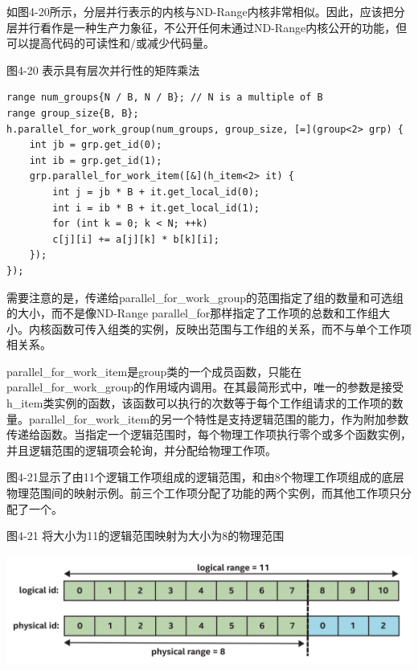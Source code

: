 如图4-20所示，分层并行表示的内核与ND-Range内核非常相似。因此，应该把分层并行看作是一种生产力象征，不公开任何未通过ND-Range内核公开的功能，但可以提高代码的可读性和/或减少代码量。\par

\hspace*{\fill} \par %
图4-20 表示具有层次并行性的矩阵乘法
\begin{lstlisting}[caption={}]
range num_groups{N / B, N / B}; // N is a multiple of B
range group_size{B, B};
h.parallel_for_work_group(num_groups, group_size, [=](group<2> grp) {
	int jb = grp.get_id(0);
	int ib = grp.get_id(1);
	grp.parallel_for_work_item([&](h_item<2> it) {
		int j = jb * B + it.get_local_id(0);
		int i = ib * B + it.get_local_id(1);
		for (int k = 0; k < N; ++k)
		c[j][i] += a[j][k] * b[k][i];
	});
});
\end{lstlisting}

需要注意的是，传递给parallel\_for\_work\_group的范围指定了组的数量和可选组的大小，而不是像ND-Range parallel\_for那样指定了工作项的总数和工作组大小。内核函数可传入组类的实例，反映出范围与工作组的关系，而不与单个工作项相关系。\par

parallel\_for\_work\_item是group类的一个成员函数，只能在parallel\_for\_work\_group的作用域内调用。在其最简形式中，唯一的参数是接受h\_item类实例的函数，该函数可以执行的次数等于每个工作组请求的工作项的数量。parallel\_for\_work\_item的另一个特性是支持逻辑范围的能力，作为附加参数传递给函数。当指定一个逻辑范围时，每个物理工作项执行零个或多个函数实例，并且逻辑范围的逻辑项会轮询，并分配给物理工作项。\par

图4-21显示了由11个逻辑工作项组成的逻辑范围，和由8个物理工作项组成的底层物理范围间的映射示例。前三个工作项分配了功能的两个实例，而其他工作项只分配了一个。\par

\hspace*{\fill} \par %
图4-21 将大小为11的逻辑范围映射为大小为8的物理范围
\begin{center}
	\includegraphics[width=1.\textwidth]{content/chapter-4/images/6}
\end{center}

